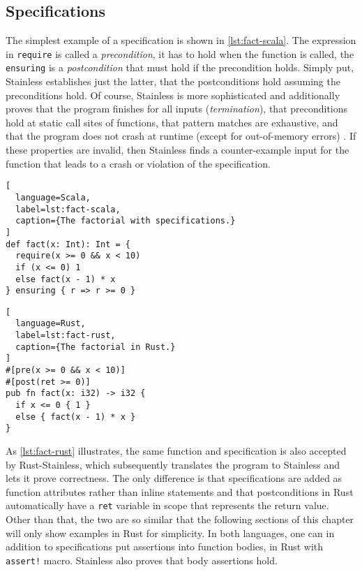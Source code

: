 \subsection{Specifications}

The simplest example of a specification is shown in \autoref{lst:fact-scala}.
The expression in \lstinline!require! is called a \emph{precondition}, it has to
hold when the function is called, the \lstinline!ensuring! is a
\emph{postcondition} that must hold if the precondition holds. Simply put,
Stainless establishes just the latter, that the postconditions hold assuming the
preconditions hold. Of course, Stainless is more sophisticated and additionally
proves that the program finishes for all inputs (\emph{termination}), that
preconditions hold at static call sites of functions, that pattern matches are
exhaustive, and that the program does not crash at runtime (except for
out-of-memory errors) \cite{stainless-doc}. If these properties are invalid,
then Stainless finds a counter-example input for the function that leads to a
crash or violation of the specification.

\noindent\begin{minipage}[t]{.47\textwidth}
\begin{lstlisting}[
  language=Scala,
  label=lst:fact-scala,
  caption={The factorial with specifications.}
]
def fact(x: Int): Int = {
  require(x >= 0 && x < 10)
  if (x <= 0) 1
  else fact(x - 1) * x
} ensuring { r => r >= 0 }
\end{lstlisting}
\end{minipage}\hfill
\begin{minipage}[t]{.47\textwidth}
\begin{lstlisting}[
  language=Rust,
  label=lst:fact-rust,
  caption={The factorial in Rust.}
]
#[pre(x >= 0 && x < 10)]
#[post(ret >= 0)]
pub fn fact(x: i32) -> i32 {
  if x <= 0 { 1 }
  else { fact(x - 1) * x }
}
\end{lstlisting}
\end{minipage}

As \autoref{lst:fact-rust} illustrates, the same function and specification is
also accepted by Rust-Stainless, which subsequently translates the program to
Stainless and lets it prove correctness. The only difference is that
specifications are added as function attributes rather than inline statements
and that postconditions in Rust automatically have a \lstinline!ret! variable in
scope that represents the return value. Other than that, the two are so similar
that the following sections of this chapter will only show examples in Rust for
simplicity. In both languages, one can in addition to specifications put
assertions into function bodies, in Rust with \lstinline"assert!" macro.
Stainless also proves that body assertions hold.

